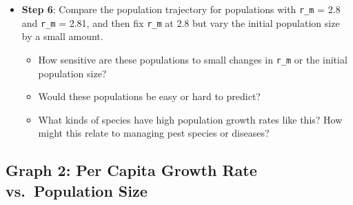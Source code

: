 \documentclass[
  a4paper]{book}
\begin{document}
\begin{itemize}
  \begin{itemize}
  \item
    How do the population dynamics change as \texttt{r\_m} increases?
  \item
    What happens when \texttt{r\_m} is 2.8 or 3.0\footnote{The behaviour where \texttt{r\_m} values above 3 cause the population to become very negative, is a mathematical artefact caused by numerical instability in the discrete-time logistic growth model. When the growth rate is too high, the population can overshoot its carrying capacity, and the formula's negative feedback term can drive the population to unrealistic, negative values. This issue arises because the model doesn't impose biological constraints, such as preventing population sizes from falling below zero. In real biological systems, such negative values would not occur.}? Are the dynamics predictable or chaotic?
  \end{itemize}
\item
  \textbf{Step 6}: Compare the population trajectory for populations with \texttt{r\_m} = 2.8 and \texttt{r\_m} = 2.81, and then fix \texttt{r\_m} at 2.8 but vary the initial population size by a small amount.

  \begin{itemize}
  \item
    How sensitive are these populations to small changes in \texttt{r\_m} or the initial population size?
  \item
    Would these populations be easy or hard to predict?
  \item
    What kinds of species have high population growth rates like this? How might this relate to managing pest species or diseases?
  \end{itemize}
\end{itemize}

\subsection{Graph 2: Per Capita Growth Rate vs.~Population Size}\label{graph-2-per-capita-growth-rate-vs.-population-size}
\end{document}
